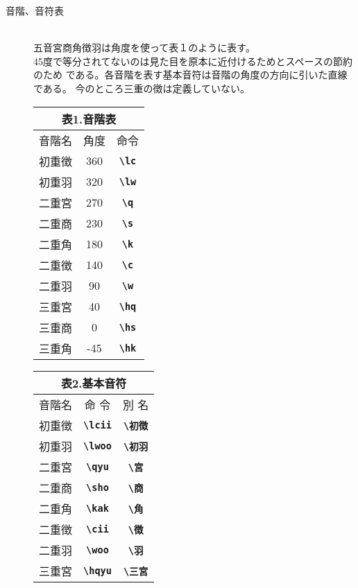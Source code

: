 \documentclass[a4paper,luatex]{l3doc}
\begin{document}
\begin{description}
 \item[音階、音符表]{　}\\
五音宮商角徴羽は角度を使って表１のように表す。\\
45度で等分されてないのは見た目を原本に近付けるためとスペースの節約のため
である。各音階を表す基本音符は音階の角度の方向に引いた直線である。
今のところ三重の徴は定義していない。

\begin{tabular}[t]{|c|c|c|}
\multicolumn{3}{c}{表1.{\bf 音階表}}\\\hline
 音階名&角度 &命令 \\\hline\hline
 初重徴&360 &{\bf \verb|\lc|} \\\hline
 初重羽&320 &{\bf \verb|\lw|} \\\hline
 二重宮&270 &{\bf \verb|\q|} \\\hline
 二重商&230 &{\bf \verb|\s|} \\\hline
 二重角&180 &{\bf \verb|\k|} \\\hline
 二重徴&140 &{\bf \verb|\c|} \\\hline
 二重羽&90 &{\bf \verb|\w|} \\\hline
 三重宮&40 &{\bf \verb|\hq|} \\\hline
 三重商&0 &{\bf \verb|\hs|} \\\hline
 三重角&-45 &{\bf \verb|\hk|} \\\hline
\end{tabular}
\ifluatex \hspace{2\zw}
\else \hspace{2zw}
\fi
\begin{tabular}[t]{|c|c|c|}
\multicolumn{3}{c}{表2.{\bf 基本音符}}\\\hline
音階名&命 令&別 名\\\hline\hline
初重徴 & {\bf \verb|\lcii|} & {\bf \verb|\初徴|} \\\hline
初重羽&{\bf \verb|\lwoo|}&{\bf \verb|\初羽|} \\\hline
二重宮&{\bf \verb|\qyu|}&{\bf \verb|\宮|} \\\hline
二重商&{\bf \verb|\sho|}&{\bf \verb|\商|} \\\hline
二重角&{\bf \verb|\kak|}&{\bf \verb|\角|} \\\hline
二重徴&{\bf \verb|\cii|}&{\bf \verb|\徴|} \\\hline
二重羽&{\bf \verb|\woo|}&{\bf \verb|\羽|} \\\hline
三重宮&{\bf \verb|\hqyu|}&{\bf \verb|\三宮|} \\\hline

\end{tabular}
\end{description}
\end{document}
